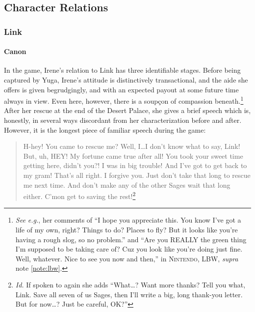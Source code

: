   \subsection{Character Relations}
  \subsubsection{Link}
  \paragraph{Canon}
  In the game, Irene's relation to Link has three identifiable stages. Before being captured by Yuga, Irene's attitude is distinctively transactional, and the aide she offers is given begrudgingly, and with an expected payout at some future time always in view. Even here, however, there is a soupçon of compassion beneath.\footnote{\label{note:nicegruff}\textit{See e.g.}, her comments of ``I hope you appreciate this. You know I’ve got a life of my own, right? Things to do? Places to fly? But it looks like you’re having a rough slog, so no problem.'' and ``Are you REALLY the green thing I’m supposed to be taking care of? Cuz you look like you’re doing just fine. Well, whatever. Nice to see you now and then,'' in \textsc{Nintendo, LBW}, \textit{supra} note \ref{note:lbw}.}  After her rescue at the end of the Desert Palace, she gives a brief speech which is, honestly, in several ways discordant from her characterization before and after. However, it is the longest piece of familiar speech during the game:\begin{quote}
  H-hey! You came to rescue me? Well, I\ldots I don’t know what to say, Link! But, uh, HEY! My fortune came true after all! You took your sweet time getting here, didn’t you?! I was in big trouble! And I’ve got to get back to my gram! That’s all right. I forgive you. Just don’t take that long to rescue me next time. And don’t make any of the other Sages wait that long either. C’mon get to saving the rest!\footnote{\textit{Id.} If spoken to again she adds ``What\ldots{}? Want more thanks? Tell you what, Link. Save all seven of us Sages, then I’ll write a big, long thank-you letter. But for now\ldots{}? Just be careful, OK?''}
  \end{quote}
